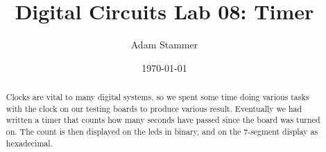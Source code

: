 \documentclass[prb,preprint]{revtex4-1}
\begin{document}
\title{Digital Circuits Lab 08: Timer}
\author{Adam Stammer}

\date{\today}

\begin{abstract}
Clocks are vital to many digital systems, so we spent some time doing various tasks with the clock on our testing boards to produce various result. Eventually we had written a timer that counts how many seconds have passed since the board was turned on. The count is then displayed on the leds in binary, and on the 7-segment display as hexadecimal.
\end{abstract}

\maketitle


%
%
%
%
%
%
%
%
\end{document}
